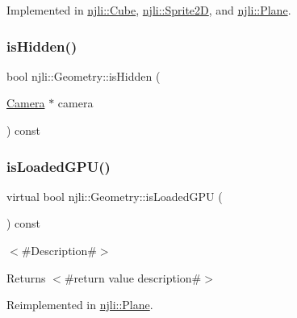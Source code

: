 Implemented in \mbox{\hyperlink{classnjli_1_1_cube_a1873e8390f7a8ffc0c8c94ad239ea0e5}{njli\+::\+Cube}}, \mbox{\hyperlink{classnjli_1_1_sprite2_d_a875c4e8392568fdd347c9730aedde9a4}{njli\+::\+Sprite2D}}, and \mbox{\hyperlink{classnjli_1_1_plane_a3c9fb24d02e80c3f2f91790bed222886}{njli\+::\+Plane}}.

\mbox{\label{classnjli_1_1_geometry_ac73f3369c9be097e8cd534ca42401c9b}} 
\subsubsection{\texorpdfstring{is\+Hidden()}{isHidden()}\hspace{0.1cm}{\footnotesize\ttfamily [2/2]}}
{\footnotesize\ttfamily bool njli\+::\+Geometry\+::is\+Hidden (\begin{DoxyParamCaption}\item[{\mbox{\hyperlink{classnjli_1_1_camera}{Camera}} $\ast$}]{camera }\end{DoxyParamCaption}) const}

\mbox{\label{classnjli_1_1_geometry_a29ac09a7f5ea68c26a410a03b8a58e16}} 
\subsubsection{\texorpdfstring{is\+Loaded\+G\+P\+U()}{isLoadedGPU()}}
{\footnotesize\ttfamily virtual bool njli\+::\+Geometry\+::is\+Loaded\+G\+PU (\begin{DoxyParamCaption}{ }\end{DoxyParamCaption}) const\hspace{0.3cm}{\ttfamily [virtual]}}

$<$\#\+Description\#$>$

\begin{DoxyReturn}{Returns}
$<$\#return value description\#$>$ 
\end{DoxyReturn}


Reimplemented in \mbox{\hyperlink{classnjli_1_1_plane_a0c9b3ff7436f10618116b3392dab9cd4}{njli\+::\+Plane}}.

\mbox{\label{classnjli_1_1_geometry_a7bbffa4f383e7a89a52e9b426d58b285}} 
